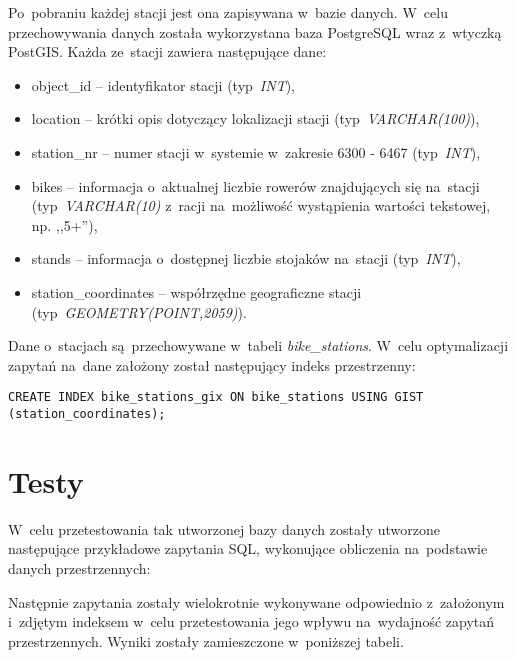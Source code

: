 \documentclass[11pt,a4paper]{article}
\begin{document}
\newpage
Po~pobraniu każdej stacji jest ona zapisywana w~bazie danych. W~celu przechowywania danych została wykorzystana baza PostgreSQL wraz z~wtyczką PostGIS. Każda ze~stacji zawiera następujące dane:
\begin{itemize}
  \item object\_id -- identyfikator stacji (typ~\emph{INT}),
  \item location -- krótki opis dotyczący lokalizacji stacji (typ~\emph{VARCHAR(100)}),
  \item station\_nr -- numer stacji w~systemie w~zakresie 6300 - 6467 (typ~\emph{INT}),
  \item bikes -- informacja o~aktualnej liczbie rowerów znajdujących się na~stacji (typ~\emph{VARCHAR(10)} z~racji na~możliwość wystąpienia wartości tekstowej, np. ,,5+''),
  \item stands -- informacja o~dostępnej liczbie stojaków na~stacji (typ~\emph{INT}),
  \item station\_coordinates -- współrzędne geograficzne stacji (typ~\emph{GEOMETRY(POINT,2059)}).
\end{itemize}

Dane o~stacjach są~przechowywane w~tabeli \emph{bike\_stations}. W~celu optymalizacji zapytań na~dane założony został następujący indeks przestrzenny:

\begin{lstlisting}[caption=Indeks przestrzenny założony na~danych w~tabeli.]
  CREATE INDEX bike_stations_gix ON bike_stations USING GIST (station_coordinates);
\end{lstlisting}

\section{Testy}
W~celu przetestowania tak utworzonej bazy danych zostały utworzone następujące przykładowe zapytania SQL, wykonujące obliczenia na~podstawie danych przestrzennych:


Następnie zapytania zostały wielokrotnie wykonywane odpowiednio z~założonym i~zdjętym indeksem w~celu przetestowania jego wpływu na~wydajność zapytań przestrzennych. Wyniki zostały zamieszczone w~poniższej tabeli.
\end{document}
